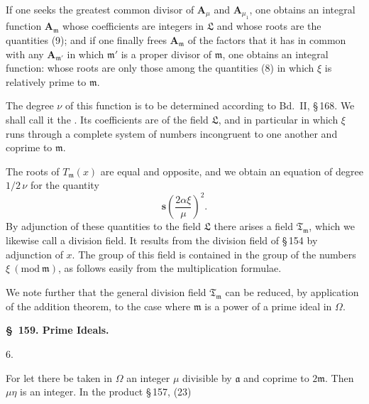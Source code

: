 If one seeks the greatest common divisor of $\boldsymbol{A}_\mu$ and
$\boldsymbol{A}_{\mu_1}$, one obtains an integral function $\boldsymbol{A}_{\mathfrak{m}}$ whose coefficients %
are integers in $\mathfrak{L}$ and whose roots are the quantities (9); and
if one finally frees $\boldsymbol{A}_{\mathfrak{m}}$ of the factors that it has in common
with any $\boldsymbol{A}_{\mathfrak{m}'}$ in which $\mathfrak{m}'$ is a proper divisor of $\mathfrak{m}$, one
obtains an integral function:
whose roots are only those among the quantities (8) in which $\xi$
is relatively prime to $\mathfrak{m}$.

The degree $\nu$ of this function is to be determined according to Bd.\ II, \S\,168.
We shall call it the . Its coefficients
are  of the field $\mathfrak{L}$, and in
particular
in which $\xi$ runs through a complete system of numbers incongruent to one
another and coprime to $\mathfrak{m}$.

The roots of $T_{\mathfrak{m}}(x)$ are equal and opposite, and
we obtain an equation of degree $1/2\,\nu$ for the quantity
\[
\boldsymbol{s}\!\left(\frac{2\alpha\xi}{\mu}\right)^{2}.
\]
By adjunction of these quantities to the field $\mathfrak{L}$ there arises
a field $\mathfrak{T}_{\mathfrak{m}}$, which we likewise call a division field. It
results from the division field of \S\,154 by adjunction
of $x$. The group of this field is contained in the group of the numbers
$\xi\ (\mathrm{mod}\ \mathfrak{m})$, as follows easily from the multiplication formulae.

We note further that the general division field
$\mathfrak{T}_{\mathfrak{m}}$ can be reduced, by application of the addition theorem, to
the case where $\mathfrak{m}$ is a power of a prime ideal in $\Omega$.

\begin{center}
\textbf{\S\ 159. Prime Ideals.}
\end{center}

6. 

For let there be taken in $\Omega$ an integer $\mu$ divisible by $\mathfrak{a}$ and
 coprime to $2\mathfrak{m}$. Then $\mu\eta$ is an integer. In the
product \S\,157, (23)
